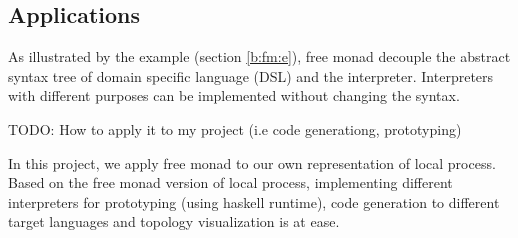 \subsection{Applications} \label{b:fm:a}
As illustrated by the example (section \ref{b:fm:e}), free monad decouple the abstract syntax tree of domain specific language (DSL) and the interpreter. Interpreters with different purposes can be implemented without changing the syntax.

TODO: How to apply it to my project (i.e code generationg, prototyping)

In this project, we apply free monad to our own representation of local process. Based on the free monad version of local process, implementing different interpreters for prototyping (using haskell runtime), code generation to different target languages and topology visualization is at ease.